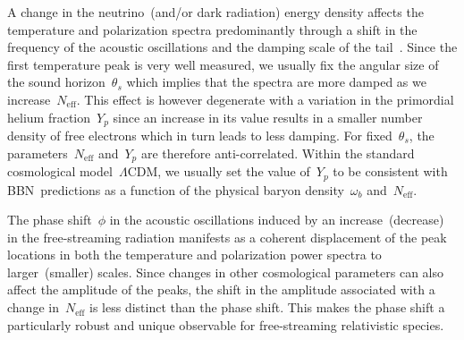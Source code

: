 \documentclass[11pt]{article}
\numberwithin{equation}{section}
\newcommand{\Neff}{N_\mathrm{eff}}
\begin{document}
A change in the neutrino~(and/or dark radiation) energy density affects the temperature and polarization spectra predominantly through a shift in the frequency of the acoustic oscillations and the damping scale of the tail~\cite{Hou:2011ec}. Since the first temperature peak is very well measured, we usually fix the angular size of the sound horizon~$\theta_s$ which implies that the spectra are more damped as we increase~$\Neff$. This effect is however degenerate with a variation in the primordial helium fraction~$Y_p$ since an increase in its value results in a smaller number density of free electrons which in turn leads to less damping. For fixed~$\theta_s$, the parameters~$\Neff$ and~$Y_p$ are therefore anti-correlated. Within the standard cosmological model~$\Lambda$CDM, we usually set the value of~$Y_p$ to be consistent with BBN~predictions as a function of the physical baryon density~$\omega_b$ and~$\Neff$.

The phase shift~$\phi$ in the acoustic oscillations induced by an increase~(decrease) in the free-streaming radiation manifests as a coherent displacement of the peak locations in both the temperature and polarization power spectra to larger~(smaller) scales. Since changes in other cosmological parameters can also affect the amplitude of the peaks, the shift in the amplitude associated with a change in~$\Neff$ is less distinct than the phase shift. This makes the phase shift a particularly robust and unique observable for free-streaming relativistic species.\medskip
\end{document}
